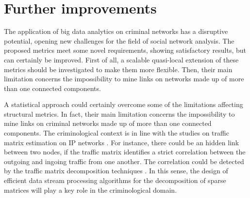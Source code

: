 \section{Further improvements}
\label{sec:further-improvements}

The application of big data analytics on criminal networks has a disruptive potential, opening new challenges for the field of social network analysis.
The proposed metrics meet some novel requirements, showing satisfactory results, but can certainly be improved. 
First of all, a scalable quasi-local extension of these metrics should be investigated to make them more flexible. 
Then, their main limitation concerns the impossibility to mine links on networks made up of more than one connected components. 

A statistical approach could certainly overcome some of the limitations affecting structural metrics. In fact, their main limitation concerns the impossibility to mine links on criminal networks made up of more than one connected components.  
The criminological context is in line with the studies on traffic matrix estimation on IP networks  \cite{medina2002traffic,benameur2004traffic,papagiannaki2004distributed}. 
For instance, there could be an hidden link between two nodes, if the traffic matrix identifies a strict correlation between the outgoing and ingoing traffic from one another. 
The correlation could be detected by the traffic matrix decomposition techniques \cite{elgamal2015analysis,jiang2015covariance}. 
In this sense, the design of efficient data stream processing algorithms for the decomposition of sparse matrices will play a key role in the criminological domain.